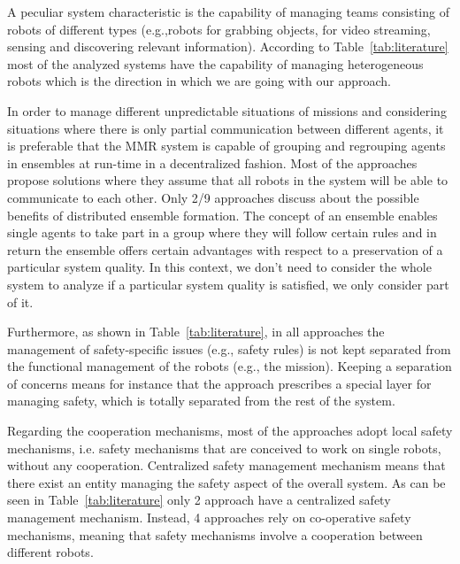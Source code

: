 \documentclass[journal]{IEEEtran}
\theoremstyle{definition}
\begin{document}
A  peculiar  system  characteristic  is  the  capability  of managing  teams  consisting  of  robots  of  different  types  (e.g.,robots for grabbing objects,  for video streaming,  sensing and discovering  relevant  information). According  to  Table~\ref{tab:literature} most of the analyzed systems have the capability of managing heterogeneous robots which is the direction in which we are going with our approach. 

In order to manage different unpredictable situations of missions and considering situations where there is only partial communication between different agents,  it is preferable  that  the MMR system is capable of grouping and regrouping agents in ensembles at run-time in a  decentralized fashion.  
Most of the approaches propose solutions where they assume that all robots in the system will be able to communicate to each other. Only 2/9 approaches discuss about the possible benefits of distributed ensemble formation. 
The concept of an ensemble enables single agents to take part in a group where they will follow certain rules and in return the ensemble offers certain advantages with respect to a preservation of a particular system quality. In this context, we don't need to consider the whole system to analyze if a particular system quality is satisfied, we only consider part of it.

Furthermore, as shown in Table~\ref{tab:literature}, in all approaches the management of safety-specific issues (e.g., safety rules) is not kept separated from the functional management of the robots (e.g., the mission). Keeping a separation of concerns means for instance that the approach prescribes a special layer for managing safety, which is totally separated from the rest of the system. 

Regarding the cooperation mechanisms,  most  of  the  approaches adopt  local  safety  mechanisms,  i.e.   safety  mechanisms  that are conceived to work on single robots, without any cooperation. Centralized safety management mechanism means that there exist an entity managing the safety aspect of the overall system. As can be seen in Table~\ref{tab:literature}
only 2 approach have a centralized safety management  mechanism.   Instead, 4  approaches  rely  on  co-operative safety mechanisms, meaning that safety mechanisms involve a cooperation between different robots.  
\end{document}
